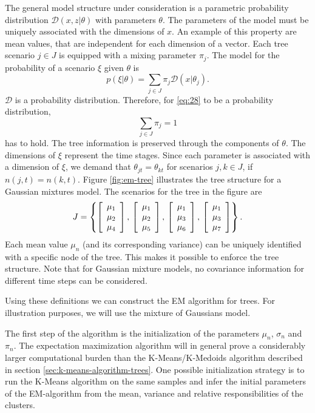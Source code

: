 The general model structure under consideration is a parametric probability distribution $\mathcal{D}(x,z|\theta)$ with parameters $\theta$.
The parameters of the model must be uniquely associated with the dimensions of $x$.
An example of this property are mean values, that are independent for each dimension of a vector.
Each tree scenario $j\in J$ is equipped with a mixing parameter $\pi_j$.
The model for the probability of a scenario $\xi$ given $\theta$ is
\begin{equation}
  \label{eq:28}
  p(\xi|\theta) = \sum_{j\in J}\pi_j\mathcal{D}(x|\theta_j).
\end{equation}
$\mathcal{D}$ is a probability distribution.
Therefore, for \eqref{eq:28} to be a probability distribution,
\begin{equation}
  \label{eq:30}
  \sum_{j\in J}\pi_j = 1
\end{equation}
has to hold.
The tree information is preserved through the components of $\theta$.
The dimensions of $\xi$ represent the time stages.
Since each parameter is associated with a dimension of $\xi$, we demand that $\theta_{jt}=\theta_{kt}$ for scenarios $j,k\in J$, if $n(j,t)=n(k,t)$.
Figure \ref{fig:em-tree} illustrates the tree structure for a Gaussian mixtures model.
The scenarios for the tree in the figure are
\[
J = \left\{\left[\begin{array}{c} \mu_1\\\mu_2\\\mu_4 \end{array}\right],\,\left[\begin{array}{c} \mu_1\\\mu_2\\\mu_5 \end{array}\right],\,\left[\begin{array}{c} \mu_1\\\mu_3\\\mu_6 \end{array}\right],\,\left[\begin{array}{c} \mu_1\\\mu_3\\\mu_7 \end{array}\right]\right\}.
\]
Each mean value $\mu_n$ (and its corresponding variance) can be uniquely identified with a specific node of the tree.
This makes it possible to enforce the tree structure.
Note that for Gaussian mixture models, no covariance information for different time steps can be considered.

Using these definitions we can construct the EM algorithm for trees.
For illustration purposes, we will use the mixture of Gaussians model.

The first step of the algorithm is the initialization of the parameters $\mu_n$, $\sigma_n$ and $\pi_n$.
The expectation maximization algorithm will in general prove a considerably larger computational burden than the K-Means/K-Medoids algorithm described in section \ref{sec:k-means-algorithm-trees}.
One possible initialization strategy is to run the K-Means algorithm on the same samples and infer the initial parameters of the EM-algorithm from the mean, variance and relative responsibilities of the clusters.

